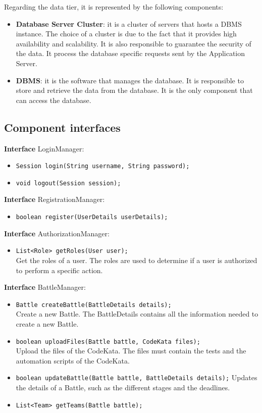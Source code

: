 Regarding the data tier, it is represented by the following components:
\begin{itemize}
    \item \textbf{Database Server Cluster}: it is a cluster of servers that hosts a DBMS instance. The choice of a cluster is due to the fact that it provides high availability and scalability. It is also responsible to guarantee the security of the data. It process the database specific requests sent by the Application Server.
    \item \textbf{DBMS}: it is the software that manages the database. It is responsible to store and retrieve the data from the database. It is the only component that can access the database.
\end{itemize}
\subsection{Component interfaces}

\textbf{Interface} LoginManager:
\begin{itemize}
    \item \texttt{Session login(String username, String password);}
    \item \texttt{void logout(Session session);}
\end{itemize}

\textbf{Interface} RegistrationManager:
\begin{itemize}
    \item \texttt{boolean register(UserDetails userDetails);}
\end{itemize}

\textbf{Interface} AuthorizationManager:
\begin{itemize}
    \item \texttt{List<Role> getRoles(User user);}
    \\ Get the roles of a user. The roles are used to determine if a user is authorized to perform a specific action.
\end{itemize}

\textbf{Interface} BattleManager:
\begin{itemize}
    \item \texttt{Battle createBattle(BattleDetails details);}
    \\ Create a new Battle. The BattleDetails contains all the information needed to create a new Battle.
    \item \texttt{boolean uploadFiles(Battle battle, CodeKata files);}
    \\ Upload the files of the CodeKata. The files must contain the tests and the automation scripts of the CodeKata.
    \item \texttt{boolean updateBattle(Battle battle, BattleDetails details);}
    Updates the details of a Battle, such as the different stages and the deadlines.
    \item \texttt{List<Team> getTeams(Battle battle);}
\end{itemize}

